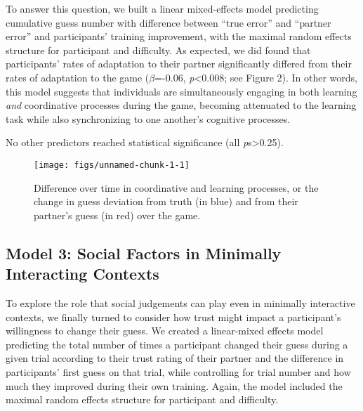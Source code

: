 \documentclass[10pt, letterpaper]{article}
\newenvironment{CodeChunk}{}{}
\begin{document}
To answer this question, we built a linear mixed-effects model
predicting cumulative guess number with difference between ``true
error'' and ``partner error'' and participants' training improvement,
with the maximal random effects structure for participant and
difficulty. As expected, we did found that participants' rates of
adaptation to their partner significantly differed from their rates of
adaptation to the game (\emph{\(\beta\)}=-0.06,
\emph{p}\textless{}0.008; see Figure 2). In other words, this model
suggests that individuals are simultaneously engaging in both learning
\emph{and} coordinative processes during the game, becoming attenuated
to the learning task while also synchronizing to one another's cognitive
processes.

No other predictors reached statistical significance (all
\emph{p}s\textgreater{}0.25).

\begin{CodeChunk}
\begin{figure}[H]

\texttt{[image: figs/unnamed-chunk-1-1]} \hfill{}

\caption[Difference over time in coordinative and learning processes, or the change in guess deviation from truth (in blue) and from their partner's guess (in red) over the game]{Difference over time in coordinative and learning processes, or the change in guess deviation from truth (in blue) and from their partner's guess (in red) over the game.}\label{fig:unnamed-chunk-1}
\end{figure}
\end{CodeChunk}

\subsection{Model 3: Social Factors in Minimally Interacting
Contexts}\label{model-3-social-factors-in-minimally-interacting-contexts}

To explore the role that social judgements can play even in minimally
interactive contexts, we finally turned to consider how trust might
impact a participant's willingness to change their guess. We created a
linear-mixed effects model predicting the total number of times a
participant changed their guess during a given trial according to their
trust rating of their partner and the difference in participants' first
guess on that trial, while controlling for trial number and how much
they improved during their own training. Again, the model included the
maximal random effects structure for participant and difficulty.
\end{document}
